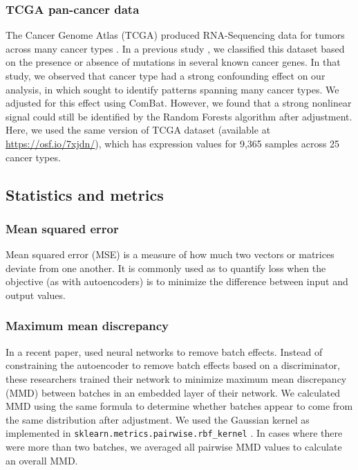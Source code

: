 \documentclass[11pt]{article}
\begin{document}
\subsubsection{TCGA pan-cancer data}

The Cancer Genome Atlas (TCGA) produced RNA-Sequencing data for tumors across many cancer types \cite{the_cancer_genome_atlas_research_network_cancer_2013}.
In a previous study \cite{dayton_classifying_2017-1}, we classified this dataset based on the presence or absence of mutations in several known cancer genes.
In that study, we observed that cancer type had a strong confounding effect on our analysis, in which sought to identify patterns spanning many cancer types. We adjusted for this effect using ComBat.
However, we found that a strong nonlinear signal could still be identified by the Random Forests algorithm after adjustment.
Here, we used the same version of TCGA dataset (available at \url{https://osf.io/7xjdn/}),
which has expression values for 9,365 samples across 25 cancer types.

\subsection{Statistics and metrics}

\subsubsection{Mean squared error}

Mean squared error (MSE) is a measure of how much two vectors or matrices deviate from one another.
It is commonly used as to quantify loss when the objective (as with autoencoders) is to minimize the difference between input and output values.

\subsubsection{Maximum mean discrepancy} \label{section:mmd}

In a recent paper, \citet{shaham_removal_2017} used neural networks to remove batch effects.
Instead of constraining the autoencoder to remove batch effects based on a discriminator, these researchers trained their network to minimize maximum mean discrepancy (MMD) between batches in an embedded layer of their network.
We calculated MMD using the same formula to determine whether batches appear to come from the same distribution after adjustment.
We used the Gaussian kernel as implemented in \texttt{sklearn.metrics.pairwise.rbf\_kernel} \cite{pedregosa_scikit-learn_2011}.
In cases where there were more than two batches, we averaged all pairwise MMD values to calculate an overall MMD.
\end{document}
